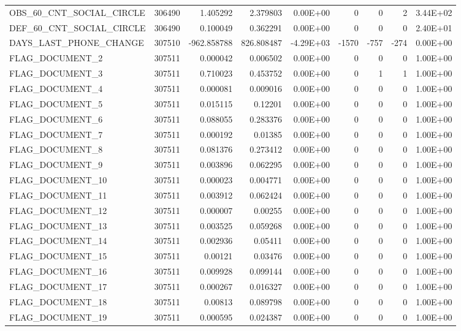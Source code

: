 \documentclass[12pt, letterpaper]{article}
\begin{document}
\begin{appendices}
{\begin{longtable}[c]{| l || r | r | r | r | r | r | r | r |}
 OBS_60_CNT_SOCIAL_CIRCLE	&	306490	&	1.405292	&	2.379803	&	0.00E+00	&	0	&	0	&	2	&	3.44E+02	\\
 DEF_60_CNT_SOCIAL_CIRCLE	&	306490	&	0.100049	&	0.362291	&	0.00E+00	&	0	&	0	&	0	&	2.40E+01	\\
 DAYS_LAST_PHONE_CHANGE	&	307510	&	-962.858788	&	826.808487	&	-4.29E+03	&	-1570	&	-757	&	-274	&	0.00E+00	\\
 FLAG_DOCUMENT_2	&	307511	&	0.000042	&	0.006502	&	0.00E+00	&	0	&	0	&	0	&	1.00E+00	\\
 FLAG_DOCUMENT_3	&	307511	&	0.710023	&	0.453752	&	0.00E+00	&	0	&	1	&	1	&	1.00E+00	\\
 FLAG_DOCUMENT_4	&	307511	&	0.000081	&	0.009016	&	0.00E+00	&	0	&	0	&	0	&	1.00E+00	\\
 FLAG_DOCUMENT_5	&	307511	&	0.015115	&	0.12201	&	0.00E+00	&	0	&	0	&	0	&	1.00E+00	\\
 FLAG_DOCUMENT_6	&	307511	&	0.088055	&	0.283376	&	0.00E+00	&	0	&	0	&	0	&	1.00E+00	\\
 FLAG_DOCUMENT_7	&	307511	&	0.000192	&	0.01385	&	0.00E+00	&	0	&	0	&	0	&	1.00E+00	\\
 FLAG_DOCUMENT_8	&	307511	&	0.081376	&	0.273412	&	0.00E+00	&	0	&	0	&	0	&	1.00E+00	\\
 FLAG_DOCUMENT_9	&	307511	&	0.003896	&	0.062295	&	0.00E+00	&	0	&	0	&	0	&	1.00E+00	\\
 FLAG_DOCUMENT_10	&	307511	&	0.000023	&	0.004771	&	0.00E+00	&	0	&	0	&	0	&	1.00E+00	\\
 FLAG_DOCUMENT_11	&	307511	&	0.003912	&	0.062424	&	0.00E+00	&	0	&	0	&	0	&	1.00E+00	\\
 FLAG_DOCUMENT_12	&	307511	&	0.000007	&	0.00255	&	0.00E+00	&	0	&	0	&	0	&	1.00E+00	\\
 FLAG_DOCUMENT_13	&	307511	&	0.003525	&	0.059268	&	0.00E+00	&	0	&	0	&	0	&	1.00E+00	\\
 FLAG_DOCUMENT_14	&	307511	&	0.002936	&	0.05411	&	0.00E+00	&	0	&	0	&	0	&	1.00E+00	\\
 FLAG_DOCUMENT_15	&	307511	&	0.00121	&	0.03476	&	0.00E+00	&	0	&	0	&	0	&	1.00E+00	\\
 FLAG_DOCUMENT_16	&	307511	&	0.009928	&	0.099144	&	0.00E+00	&	0	&	0	&	0	&	1.00E+00	\\
 FLAG_DOCUMENT_17	&	307511	&	0.000267	&	0.016327	&	0.00E+00	&	0	&	0	&	0	&	1.00E+00	\\
 FLAG_DOCUMENT_18	&	307511	&	0.00813	&	0.089798	&	0.00E+00	&	0	&	0	&	0	&	1.00E+00	\\
 FLAG_DOCUMENT_19	&	307511	&	0.000595	&	0.024387	&	0.00E+00	&	0	&	0	&	0	&	1.00E+00	\\

\end{longtable}}
\end{appendices}
\end{document}

